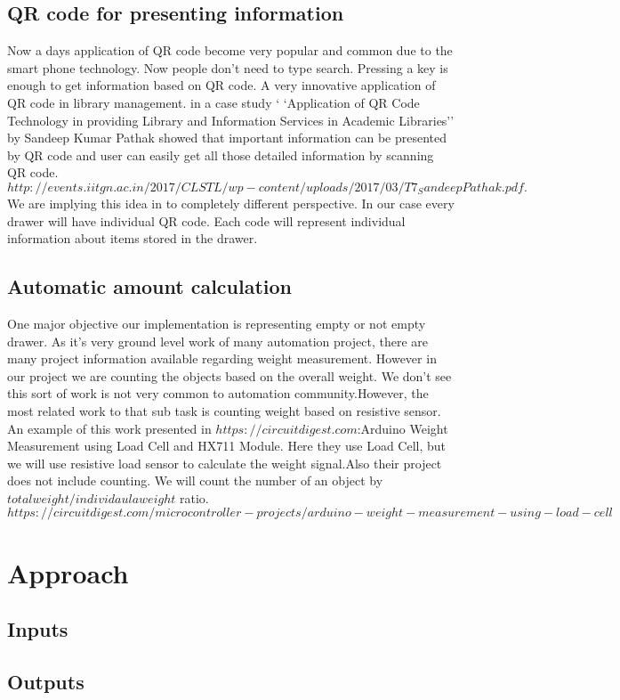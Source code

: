 \documentclass{sigchi}
\begin{document}
\subsection{QR code for presenting information}
Now a days application of QR code become very popular and common due to the smart phone technology. Now people don't need to type search. Pressing a key is enough to get information based on QR code. A very innovative application of QR code in library management. in a case study ` `Application of QR Code Technology in providing Library and Information Services in Academic Libraries'' by  Sandeep
Kumar Pathak showed that important information can be presented by QR code and user can easily get all those detailed information by scanning QR code. $http://events.iitgn.ac.in/2017/CLSTL/wp-content/uploads/2017/03/T7_SandeepPathak.pdf.$
We are implying this idea in to completely different perspective. In our case every drawer will have individual QR code. Each code will represent individual information about items stored in the drawer. 
\subsection{Automatic amount calculation}
One major objective our implementation is representing empty or not empty drawer. As it's very ground level work of many automation project, there are many project information available regarding weight measurement. However in our project we are counting the objects based on the overall weight. We don't see this sort of work is not very common to automation community.However, the most related work to that sub task is counting weight based on resistive sensor. An example of this work presented in $https://circuitdigest.com$:Arduino Weight Measurement using Load Cell and HX711 Module. Here they use Load Cell, but we will use resistive load sensor to calculate the weight signal.Also their project does not include counting. We will count the number of an object by $totalweight/individaula weight$ ratio. 
$https://circuitdigest.com/microcontroller-projects/arduino-weight-measurement-using-load-cell$
\section{Approach}

\subsection{Inputs}
\subsection{Outputs}
\end{document}
